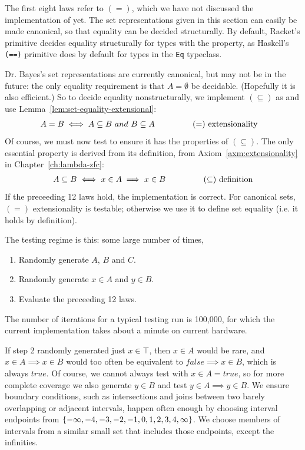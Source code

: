 The first eight laws refer to $(=)$, which we have not discussed the implementation of yet.
The set representations given in this section can easily be made canonical, so that equality can be decided structurally.
By default, Racket's  primitive decides equality structurally for types with the  property, as Haskell's \texttt{(==)} primitive does by default for types in the \texttt{Eq} typeclass.

Dr. Bayes's set representations are currently canonical, but may not be in the future: the only equality requirement is that $A = \emptyset$ be decidable.
(Hopefully it is also efficient.)
So to decide equality nonstructurally, we implement $(\subseteq)$ as  and use Lemma~\ref{lem:set-equality-extensional}:
\begin{equation}
\begin{aligned}
	&A = B \iff A \subseteq B~and~B \subseteq A
	\hspace{0.5in} &&\text{$(=)$ extensionality}
\end{aligned}
\end{equation}
Of course, we must now test  to ensure it has the properties of $(\subseteq)$.
The only essential property is derived from its definition, from Axiom~\ref{axm:extensionality} in Chapter~\ref{ch:lambda-zfc}:
\begin{equation}
\begin{aligned}
	A \subseteq B \iff x \in A \implies x \in B
	\hspace{0.5in} &&\text{$(\subseteq)$ definition}
\end{aligned}
\end{equation}
If the preceeding 12 laws hold, the implementation is correct.
For canonical sets, $(=)$ extensionality is testable; otherwise we use it to define set equality (i.e. it holds by definition).

The testing regime is this: some large number of times,
\begin{enumerate}
	\item Randomly generate $A$, $B$ and $C$.
	\item Randomly generate $x \in A$ and $y \in B$.
	\item Evaluate the preceeding 12 laws.
\end{enumerate}
The number of iterations for a typical testing run is 100,000, for which the current implementation takes about a minute on current hardware.

If step 2 randomly generated just $x \in \top$, then $x \in A$ would be rare, and $x \in A \implies x \in B$ would too often be equivalent to $false \implies x \in B$, which is always $true$.
Of course, we cannot always test with $x \in A = true$, so for more complete coverage we also generate $y \in B$ and test $y \in A \implies y \in B$.
We ensure boundary conditions, such as intersections and joins between two barely overlapping or adjacent intervals, happen often enough by choosing interval endpoints from $\{{-\infty,-4,-3,-2,-1,0,1,2,3,4,\infty}\}$.
We choose members of intervals from a similar small set that includes those endpoints, except the infinities.

